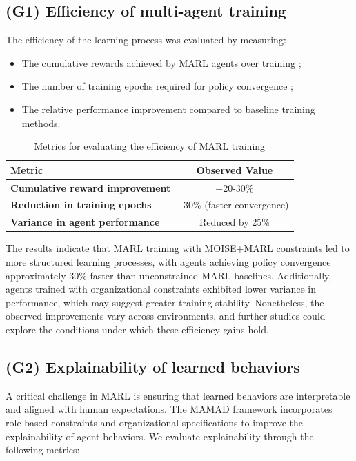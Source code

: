 \documentclass[journal]{IEEEtai}
\begin{document}
\subsection{(G1) Efficiency of multi-agent training}

The efficiency of the learning process was evaluated by measuring:
\begin{itemize}
    \item The cumulative rewards achieved by MARL agents over training ;
    \item The number of training epochs required for policy convergence ;
    \item The relative performance improvement compared to baseline training methods.
\end{itemize}

\begin{table}[h!]
    \centering
    \caption{Metrics for evaluating the efficiency of MARL training}
    \begin{tabular}{|l|c|}
        \hline
        \textbf{Metric} & \textbf{Observed Value} \\
        \hline
        \textbf{Cumulative reward improvement} & +20-30\% \\
        \hline
        \textbf{Reduction in training epochs} & -30\% (faster convergence) \\
        \hline
        \textbf{Variance in agent performance} & Reduced by 25\% \\
        \hline
    \end{tabular}
    \label{tab:efficiency}
\end{table}

The results indicate that MARL training with MOISE+MARL constraints led to more structured learning processes, with agents achieving policy convergence approximately 30\% faster than unconstrained MARL baselines. Additionally, agents trained with organizational constraints exhibited lower variance in performance, which may suggest greater training stability. Nonetheless, the observed improvements vary across environments, and further studies could explore the conditions under which these efficiency gains hold.

\subsection{(G2) Explainability of learned behaviors}

A critical challenge in MARL is ensuring that learned behaviors are interpretable and aligned with human expectations. The MAMAD framework incorporates role-based constraints and organizational specifications to improve the explainability of agent behaviors. We evaluate explainability through the following metrics:
\end{document}
